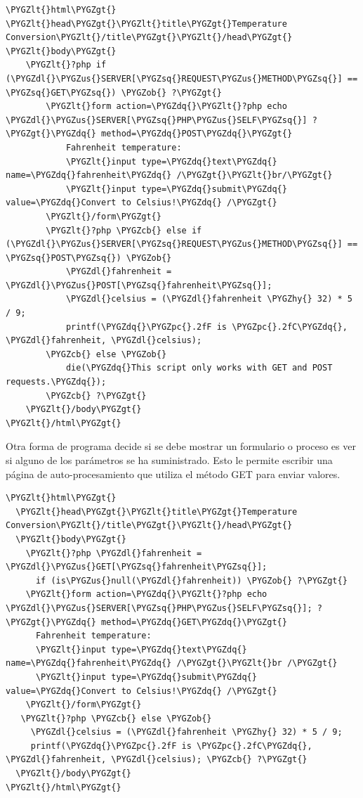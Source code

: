 \documentclass[a5paper,10pt,spanish]{sphinxmanual}
\def\PYGZus{\char`\_}
\def\PYGZob{\char`\{}
\def\PYGZcb{\char`\}}
\def\PYGZlt{\char`\<}
\def\PYGZgt{\char`\>}
\def\PYGZpc{\char`\%}
\def\PYGZdl{\char`\$}
\def\PYGZhy{\char`\-}
\def\PYGZsq{\char`\'}
\def\PYGZdq{\char`\"}
\begin{document}
\begin{Verbatim}[commandchars=\\\{\}]
\PYGZlt{}html\PYGZgt{}
\PYGZlt{}head\PYGZgt{}\PYGZlt{}title\PYGZgt{}Temperature Conversion\PYGZlt{}/title\PYGZgt{}\PYGZlt{}/head\PYGZgt{}
\PYGZlt{}body\PYGZgt{}
    \PYGZlt{}?php if (\PYGZdl{}\PYGZus{}SERVER[\PYGZsq{}REQUEST\PYGZus{}METHOD\PYGZsq{}] == \PYGZsq{}GET\PYGZsq{}) \PYGZob{} ?\PYGZgt{}
        \PYGZlt{}form action=\PYGZdq{}\PYGZlt{}?php echo \PYGZdl{}\PYGZus{}SERVER[\PYGZsq{}PHP\PYGZus{}SELF\PYGZsq{}] ?\PYGZgt{}\PYGZdq{} method=\PYGZdq{}POST\PYGZdq{}\PYGZgt{}
            Fahrenheit temperature:
            \PYGZlt{}input type=\PYGZdq{}text\PYGZdq{} name=\PYGZdq{}fahrenheit\PYGZdq{} /\PYGZgt{}\PYGZlt{}br/\PYGZgt{}
            \PYGZlt{}input type=\PYGZdq{}submit\PYGZdq{} value=\PYGZdq{}Convert to Celsius!\PYGZdq{} /\PYGZgt{}
        \PYGZlt{}/form\PYGZgt{}
        \PYGZlt{}?php \PYGZcb{} else if (\PYGZdl{}\PYGZus{}SERVER[\PYGZsq{}REQUEST\PYGZus{}METHOD\PYGZsq{}] == \PYGZsq{}POST\PYGZsq{}) \PYGZob{}
            \PYGZdl{}fahrenheit = \PYGZdl{}\PYGZus{}POST[\PYGZsq{}fahrenheit\PYGZsq{}];
            \PYGZdl{}celsius = (\PYGZdl{}fahrenheit \PYGZhy{} 32) * 5 / 9;
            printf(\PYGZdq{}\PYGZpc{}.2fF is \PYGZpc{}.2fC\PYGZdq{}, \PYGZdl{}fahrenheit, \PYGZdl{}celsius);
        \PYGZcb{} else \PYGZob{}
            die(\PYGZdq{}This script only works with GET and POST requests.\PYGZdq{});
        \PYGZcb{} ?\PYGZgt{}
    \PYGZlt{}/body\PYGZgt{}
\PYGZlt{}/html\PYGZgt{}
\end{Verbatim}

Otra forma de programa decide si se debe mostrar un formulario o proceso
es ver si alguno de los parámetros se ha suministrado. Esto le permite
escribir una página de auto-procesamiento que utiliza el método GET para
enviar valores.

\begin{Verbatim}[commandchars=\\\{\}]
\PYGZlt{}html\PYGZgt{}
  \PYGZlt{}head\PYGZgt{}\PYGZlt{}title\PYGZgt{}Temperature Conversion\PYGZlt{}/title\PYGZgt{}\PYGZlt{}/head\PYGZgt{}
  \PYGZlt{}body\PYGZgt{}
    \PYGZlt{}?php \PYGZdl{}fahrenheit = \PYGZdl{}\PYGZus{}GET[\PYGZsq{}fahrenheit\PYGZsq{}];
      if (is\PYGZus{}null(\PYGZdl{}fahrenheit)) \PYGZob{} ?\PYGZgt{}
    \PYGZlt{}form action=\PYGZdq{}\PYGZlt{}?php echo \PYGZdl{}\PYGZus{}SERVER[\PYGZsq{}PHP\PYGZus{}SELF\PYGZsq{}]; ?\PYGZgt{}\PYGZdq{} method=\PYGZdq{}GET\PYGZdq{}\PYGZgt{}
      Fahrenheit temperature:
      \PYGZlt{}input type=\PYGZdq{}text\PYGZdq{} name=\PYGZdq{}fahrenheit\PYGZdq{} /\PYGZgt{}\PYGZlt{}br /\PYGZgt{}
      \PYGZlt{}input type=\PYGZdq{}submit\PYGZdq{} value=\PYGZdq{}Convert to Celsius!\PYGZdq{} /\PYGZgt{}
    \PYGZlt{}/form\PYGZgt{}
   \PYGZlt{}?php \PYGZcb{} else \PYGZob{}
     \PYGZdl{}celsius = (\PYGZdl{}fahrenheit \PYGZhy{} 32) * 5 / 9;
     printf(\PYGZdq{}\PYGZpc{}.2fF is \PYGZpc{}.2fC\PYGZdq{}, \PYGZdl{}fahrenheit, \PYGZdl{}celsius); \PYGZcb{} ?\PYGZgt{}
  \PYGZlt{}/body\PYGZgt{}
\PYGZlt{}/html\PYGZgt{}
\end{Verbatim}
\end{document}
